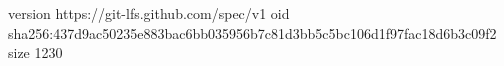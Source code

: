 version https://git-lfs.github.com/spec/v1
oid sha256:437d9ac50235e883bac6bb035956b7c81d3bb5c5bc106d1f97fac18d6b3c09f2
size 1230
